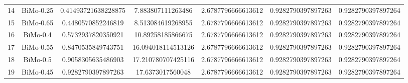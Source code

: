 \documentclass[a4paper,10pt]{article}
\begin{document}
\begin{landscape}
\begin{table}[!htp]
\begin{tabular}{ccccccc}
14&BiMo-0.25&0.41493721638228875&7.883807111263486&2.6787796666613612&0.9282790397897263&0.9282790397897264\\
15&BiMo-0.65&0.4480570852246819&8.513084619268955&2.6787796666613612&0.9282790397897263&0.9282790397897264\\
16&BiMo-0.4&0.5732937820350921&10.89258185866675&2.6787796666613612&0.9282790397897263&0.9282790397897264\\
17&BiMo-0.55&0.8470535849743751&16.094018114513126&2.6787796666613612&0.9282790397897263&0.9282790397897264\\
18&BiMo-0.5&0.9058305635486903&17.210780707425116&2.6787796666613612&0.9282790397897263&0.9282790397897264\\
19&BiMo-0.45&0.9282790397897263&17.6373017560048&2.6787796666613612&0.9282790397897263&0.9282790397897264\\
\hline
\end{tabular}
\end{table}


\end{landscape}
\end{document}
